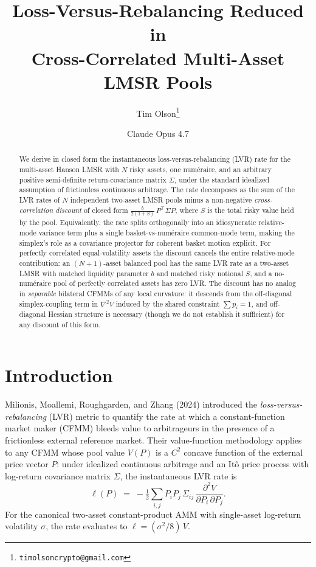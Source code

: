 \documentclass[11pt]{article}
\title{Loss-Versus-Rebalancing Reduced in\\Cross-Correlated Multi-Asset LMSR Pools}
\author{Tim Olson\thanks{\texttt{timolsoncrypto@gmail.com}} \and Claude Opus 4.7}
\date{}
\newcommand{\transp}{^{\!\top}}
\begin{document}
\maketitle

\begin{abstract}
We derive in closed form the instantaneous loss-versus-rebalancing (LVR) rate for the multi-asset Hanson LMSR with $N$ risky assets, one num\'eraire, and an arbitrary positive semi-definite return-covariance matrix $\Sigma$, under the standard idealized assumption of frictionless continuous arbitrage. The rate decomposes as the sum of the LVR rates of $N$ independent two-asset LMSR pools minus a non-negative \emph{cross-correlation discount} of closed form $\tfrac{b}{2(1+S)}\,P\transp\Sigma P$, where $S$ is the total risky value held by the pool. Equivalently, the rate splits orthogonally into an idiosyncratic relative-mode variance term plus a single basket-vs-num\'eraire common-mode term, making the simplex's role as a covariance projector for coherent basket motion explicit. For perfectly correlated equal-volatility assets the discount cancels the entire relative-mode contribution: an $(N{+}1)$-asset balanced pool has the same LVR rate as a two-asset LMSR with matched liquidity parameter $b$ and matched risky notional $S$, and a no-num\'eraire pool of perfectly correlated assets has zero LVR. The discount has no analog in \emph{separable} bilateral CFMMs of any local curvature: it descends from the off-diagonal simplex-coupling term in $\nabla^2 V$ induced by the shared constraint $\sum p_i = 1$, and off-diagonal Hessian structure is necessary (though we do not establish it sufficient) for any discount of this form.
\end{abstract}

\section{Introduction}

Milionis, Moallemi, Roughgarden, and Zhang (2024) introduced the \emph{loss-versus-rebalancing} (LVR) metric to quantify the rate at which a constant-function market maker (CFMM) bleeds value to arbitrageurs in the presence of a frictionless external reference market. Their value-function methodology applies to any CFMM whose pool value $V(P)$ is a $C^2$ concave function of the external price vector $P$: under idealized continuous arbitrage and an It\^o price process with log-return covariance matrix $\Sigma$, the instantaneous LVR rate is
\begin{equation*}
\ell(P) \;=\; -\tfrac{1}{2}\sum_{i,j} P_i P_j \,\Sigma_{ij}\, \frac{\partial^2 V}{\partial P_i\,\partial P_j}. \tag{0}
\end{equation*}
For the canonical two-asset constant-product AMM with single-asset log-return volatility $\sigma$, the rate evaluates to $\ell = (\sigma^2/8)\,V$.
\end{document}
